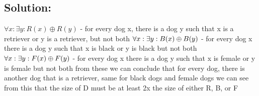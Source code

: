 \documentclass[12pt]{article}
\begin{document}
\subsection*{\textbf{Solution:}}
$\forall x: \exists y: R(x) \oplus R(y)$ - for every dog x, there is a dog y such that x is a retriever or y is a retriever, but not both
$\newline \forall x : \exists y : B(x) \oplus B(y)$ - for every dog x there is a dog y such that x is black or y is black but not both
 $\newline \forall x: \exists y: F(x) \oplus F(y)$ - for every dog x there is a dog y such that x is female or y is female but not both
from these we can conclude that for every dog, there is another dog that is a retriever, same for black dogs and female dogs
we can see from this that the size of D must be at least 2x the size of either R, B, or F
\end{document}
